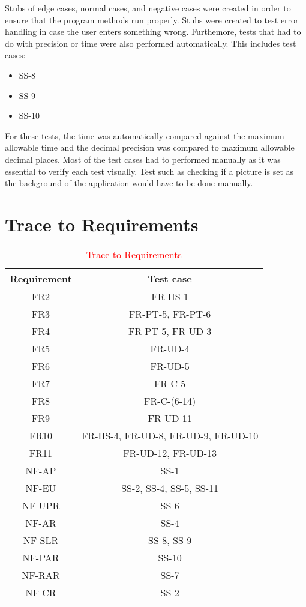 \documentclass[12pt, titlepage]{article}
\begin{document}
\noindent Stubs of edge cases, normal cases, and negative cases were created in order to ensure that the program methods run properly. Stubs were created to test error handling in case the user enters something wrong. Furthemore, tests that had to do with precision or time were also performed automatically. This includes test cases:
\begin{itemize}
\item{SS-8}
\item{SS-9}
\item{SS-10}
\end{itemize}

\noindent For these tests, the time was automatically compared against the maximum allowable time and the decimal precision was compared to maximum allowable decimal places. Most of the test cases had to performed manually as it was essential to verify each test visually. Test such as checking if a picture is set as the background of the application would have to be done manually.

\section{Trace to Requirements}
\begin{table}[H]
     \centering
	\begin{tabular}{|c|c|}
		\hline
		\hline
		Requirement & Test case\\
		\hline
		FR2& FR-HS-1\\
		\hline
		FR3 & FR-PT-5, FR-PT-6\\
		\hline
		FR4 & FR-PT-5, FR-UD-3\\ 
		\hline 
		FR5 & FR-UD-4\\
		\hline
	   	 FR6 & FR-UD-5\\
	   	 \hline
	   	 FR7 & FR-C-5\\
		\hline
		FR8 & FR-C-(6-14)\\
		\hline
		FR9&FR-UD-11\\
		\hline
		FR10&FR-HS-4, FR-UD-8, FR-UD-9, FR-UD-10\\
		\hline
		FR11 & FR-UD-12, FR-UD-13\\
		\hline
		NF-AP & SS-1\\
		\hline
		NF-EU & SS-2, SS-4, SS-5, SS-11\\
		\hline
		NF-UPR & SS-6\\
		\hline
		NF-AR & SS-4\\
		\hline
		NF-SLR & SS-8, SS-9\\
		\hline 
		NF-PAR & SS-10\\
		\hline
		NF-RAR & SS-7\\
		\hline
		NF-CR & SS-2\\
		\hline
		\hline
		
	\end{tabular}
		\caption{\textcolor{red}{Trace to Requirements}}
		\label{table}
\end{table}
\end{document}
